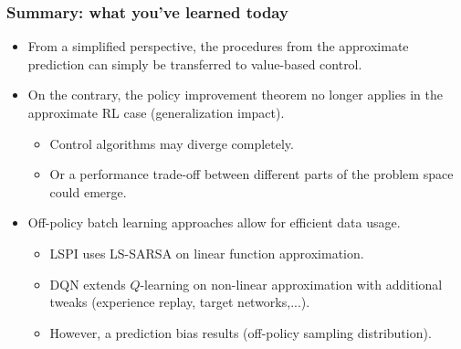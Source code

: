 \begin{frame}
\frametitle{Summary: what you've learned today}
\begin{itemize}
	\item From a simplified perspective, the procedures from the approximate prediction can simply be transferred to value-based control.\pause
	\item On the contrary, the policy improvement theorem no longer applies in the approximate RL case (generalization impact).\pause
	\begin{itemize}
		\item Control algorithms may diverge completely.\pause
		\item Or a performance trade-off between different parts of the problem space could emerge.\pause
	\end{itemize}
	\item Off-policy batch learning approaches allow for efficient data usage.
	\begin{itemize}
		\item LSPI uses LS-SARSA on linear function approximation.\pause
		\item DQN extends $Q$-learning on non-linear approximation with additional tweaks (experience replay, target networks,...).\pause
		\item However, a prediction bias results (off-policy sampling distribution).  
	\end{itemize}
\end{itemize}
\end{frame}